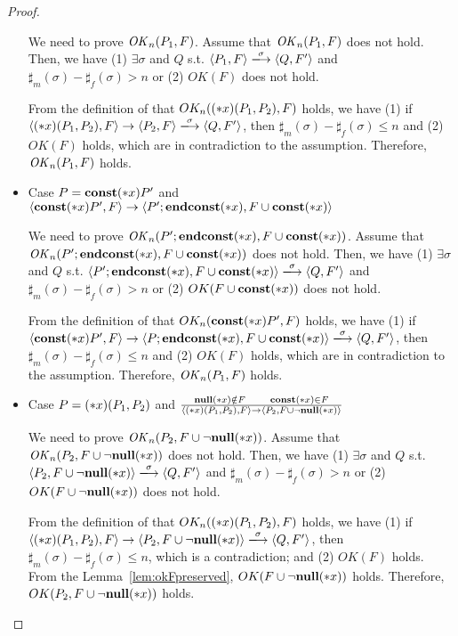 \begin{proof}
\begin{itemize}
  We need to prove \(\mathit{OK}_n(P_1, F)\).  Assume that \(\mathit{OK}_n(P_1, F)\)
  does not hold. Then, we have (1) \( \exists \sigma \) and \(Q\)
  s.t. \( \langle P_1, F \rangle \xlongrightarrow{\sigma} \langle Q,
  F' \rangle \) and \(\sharp_{m}(\sigma) -
  \sharp_{f}(\sigma) > n\) or (2) \( OK(F)\) does not hold.

  From the definition of that \(OK_n((*x)(P_1, P_2), F)\) holds, we
  have (1) if \( \langle \Sirx(P_1, P_2), F \rangle \rightarrow
  \langle P_2, F \rangle \xlongrightarrow{\sigma} \langle Q, F'
  \rangle \), then \(\sharp_m(\sigma) -
  \sharp_f(\sigma) \le n \) and (2) \(OK(F)\) holds, which are in
  contradiction to the assumption.  Therefore, \(\mathit{OK}_n(P_1, F)\)
  holds.

\item Case \( P = \mathbf{const}(*x) P' \) and \( \langle \mathbf{const}(*x) P', F \rangle
  \rightarrow \langle P';\mathbf{endconst}(*x), F\cup{\mathbf{const}(*x)} \rangle  \)

  We need to prove \(\mathit{OK}_n(P';\mathbf{endconst}(*x), F\cup{\mathbf{const}(*x)})\).  Assume
  that \(\mathit{OK}_n(P';\mathbf{endconst}(*x), F\cup{\mathbf{const}(*x)})\) does not hold. Then,
  we have (1) \( \exists \sigma \) and \(Q\) s.t. \( \langle
  P';\Endconst, F\cup{\scon\Sirx} \rangle \xlongrightarrow{\sigma}
  \langle Q, F' \rangle \) and \(\sharp_{m}(\sigma) -
  \sharp_{f}(\sigma) > n\) or (2) \( OK(F\cup{\mathbf{const}(*x)})\) does not
  hold.

  From the definition of that \(OK_n(\mathbf{const}(*x) P', F)\) holds, we
  have (1) if \( \langle \scon\Sirx P', F \rangle \rightarrow \langle
  P;\Endconst, F\cup{\scon\Sirx} \rangle \xlongrightarrow{\sigma}
  \langle Q, F' \rangle \), then \(\sharp_m(\sigma) -
  \sharp_f(\sigma) \le n \) and (2) \(OK(F)\) holds, which are in
  contradiction to the assumption.  Therefore, \(\mathit{OK}_n(P_1, F)\)
  holds.

\item Case \( P = (*x)(P_1,P_2) \) and \( \frac{ {\bf null}(*x) \notin F
  \quad\quad \mathbf{const}(*x) \in F} { \langle (*x)(P_1, P_2), F \rangle
  \rightarrow \langle P_2, F\cup{\neg{\bf null}(*x)} \rangle } \)

  We need to prove \(\mathit{OK}_n(P_2, F\cup{\neg{\bf null}(*x)})\).  Assume that
  \(\mathit{OK}_n(P_2, F\cup{\neg{\bf null}(*x)})\) does not hold. Then, we have (1) \(
  \exists \sigma \) and \(Q\) s.t. \( \langle P_2, F\cup{\snnull}
  \rangle \xlongrightarrow{\sigma} \langle Q, F' \rangle \) and
  \(\sharp_{m}(\sigma) - \sharp_{f}(\sigma) > n\) or (2) \(
  OK(F\cup{\neg{\bf null}(*x)})\) does not hold.

  From the definition of that \(OK_n((*x)(P_1, P_2), F)\) holds, we
  have (1) if \( \langle \Sirx(P_1, P_2), F \rangle \rightarrow
  \langle P_2, F\cup{\snnull} \rangle \xlongrightarrow{\sigma} \langle
  Q, F' \rangle \), then \(\sharp_m(\sigma) -
  \sharp_f(\sigma) \le n \), which is a contradiction; and (2)
  \(OK(F)\) holds. From the Lemma~\ref{lem:okFpreserved},
  \(OK(F\cup{\neg{\bf null}(*x)})\) holds. Therefore, \(OK(P_2, F\cup{\neg{\bf null}(*x)})\)
  holds.


\end{itemize}
\end{proof}
